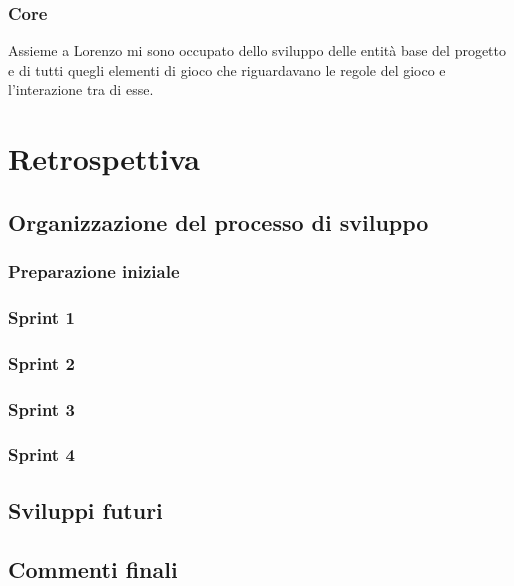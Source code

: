 \documentclass{article}
\begin{document}
    \subsubsection{Core}
    Assieme a Lorenzo mi sono occupato dello sviluppo delle entità base del progetto e di tutti quegli elementi di gioco che riguardavano le regole del gioco e l'interazione tra di esse.

    \newpage


    \section{Retrospettiva}\label{sec:retrospettiva}
    \subsection{Organizzazione del processo di sviluppo}
    \subsubsection{Preparazione iniziale}
    \subsubsection{Sprint 1}
    \subsubsection{Sprint 2}
    \subsubsection{Sprint 3}
    \subsubsection{Sprint 4}

    \subsection{Sviluppi futuri}

    \subsection{Commenti finali}
\end{document}
